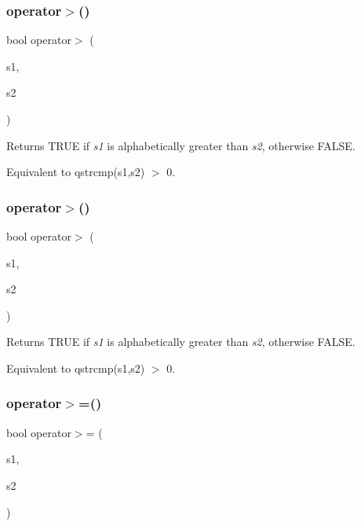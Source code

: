 \subsubsection{\texorpdfstring{operator$>$()}{operator>()}\hspace{0.1cm}{\footnotesize\ttfamily [1/2]}}
{\footnotesize\ttfamily bool operator$>$ (\begin{DoxyParamCaption}\item[{const char $\ast$}]{s1,  }\item[{const \mbox{\hyperlink{class_q_string}{Q\+String}} \&}]{s2 }\end{DoxyParamCaption})\hspace{0.3cm}{\ttfamily [related]}}

Returns T\+R\+UE if {\itshape s1} is alphabetically greater than {\itshape s2}, otherwise F\+A\+L\+SE.

Equivalent to {\ttfamily qstrcmp(s1,s2) $>$ 0}. \mbox{\label{class_q_string_ab0ce893122b9d85769be403013196aed}} 
\subsubsection{\texorpdfstring{operator$>$()}{operator>()}\hspace{0.1cm}{\footnotesize\ttfamily [2/2]}}
{\footnotesize\ttfamily bool operator$>$ (\begin{DoxyParamCaption}\item[{const \mbox{\hyperlink{class_q_string}{Q\+String}} \&}]{s1,  }\item[{const char $\ast$}]{s2 }\end{DoxyParamCaption})\hspace{0.3cm}{\ttfamily [related]}}

Returns T\+R\+UE if {\itshape s1} is alphabetically greater than {\itshape s2}, otherwise F\+A\+L\+SE.

Equivalent to {\ttfamily qstrcmp(s1,s2) $>$ 0}. \mbox{\label{class_q_string_a9f4787df63780750a94f131e7a35ac6c}} 
\subsubsection{\texorpdfstring{operator$>$=()}{operator>=()}\hspace{0.1cm}{\footnotesize\ttfamily [1/2]}}
{\footnotesize\ttfamily bool operator$>$= (\begin{DoxyParamCaption}\item[{const char $\ast$}]{s1,  }\item[{const \mbox{\hyperlink{class_q_string}{Q\+String}} \&}]{s2 }\end{DoxyParamCaption})\hspace{0.3cm}{\ttfamily [related]}}

